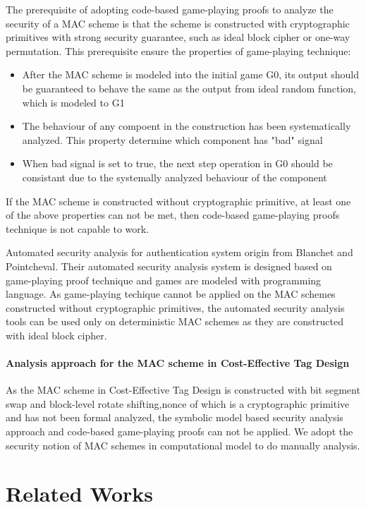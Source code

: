 \documentclass{article}
\begin{document}
The prerequisite of adopting code-based game-playing proofs to analyze the
security of a MAC scheme is that the scheme is constructed with cryptographic
primitives with strong security guarantee, such as ideal block cipher or one-way
permutation. This prerequisite ensure the properties of game-playing technique:
\begin{itemize}
	\item After the MAC scheme is modeled into the initial game G0, its output should be
guaranteed to behave the same as the output from ideal random function, which is
modeled to G1
	\item The behaviour of any compoent in the construction has been
systematically analyzed. This property determine which component has "bad"
signal 
	\item When bad signal is set to true, the next step operation in G0 should
be consistant due to the systemally analyzed behaviour of the component 
\end{itemize}
If the MAC scheme is constructed without cryptographic primitive, at least one
of the above properties can not be met, then code-based game-playing proofs
technique is not capable to work.

Automated security analysis for authentication system origin from Blanchet and
Pointcheval\cite{blanchet2006automated}. Their automated security analysis system is designed based on
game-playing proof technique and games are modeled with programming language. As
game-playing techique cannot be applied on the MAC schemes constructed without
cryptographic primitives, the automated security analysis tools can be used only
on deterministic MAC schemes as they are constructed with ideal block cipher.   
\paragraph{Analysis approach for the MAC scheme in Cost-Effective Tag Design}
As the MAC scheme in Cost-Effective Tag Design is constructed with bit segment
swap and block-level rotate shifting,nonce of which is a cryptographic primitive
and has not been formal analyzed, the symbolic model based security analysis
approach and code-based game-playing proofs can not be applied. We adopt the
security notion of MAC schemes in computational model to do manually analysis.

\section{Related Works} 
\end{document}
